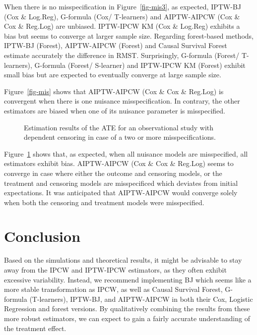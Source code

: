 \documentclass[
  11pt,
  a4paper,
]{article}
\theoremstyle{plain}
\theoremstyle{plain}
\theoremstyle{plain}
\theoremstyle{definition}
\theoremstyle{remark}
\begin{document}
When there is no misspecification in Figure~\ref{fig-mis3}, as expected,
IPTW-BJ (Cox \& Log.Reg), G-formula (Cox/ T-learners) and AIPTW-AIPCW
(Cox \& Cox \& Reg.Log) are unbiased. IPTW-IPCW KM (Cox \& Log.Reg)
exhibits a bias but seems to converge at larger sample size. Regarding
forest-based methods, IPTW-BJ (Forest), AIPTW-AIPCW (Forest) and Causal
Survival Forest estimate accurately the difference in RMST.
Surprisingly, G-formula (Forest/ T-learners), G-formula (Forest/
S-learner) and IPTW-IPCW KM (Forest) exhibit small bias but are expected
to eventually converge at large sample size.

Figure~\ref{fig-mis} shows that AIPTW-AIPCW (Cox \& Cox \& Reg.Log) is
convergent when there is one nuisance misspecification. In contrary, the
other estimators are biased when one of its nuisance parameter is
misspecified.

\begin{figure}


\caption{\label{fig-mis2}Estimation results of the ATE for an
observational study with dependent censoring in case of a two or more
misspecifications.}

\end{figure}%

Figure~\ref{fig-mis2} shows that, as expected, when all nuisance models
are misspecified, all estimators exhibit bias. AIPTW-AIPCW (Cox \& Cox
\& Reg.Log) seems to converge in case where either the outcome and
censoring models, or the treatment and censoring models are
misspecificed which deviates from initial expectations. It was
anticipated that AIPTW-AIPCW would converge solely when both the
censoring and treatment models were misspecified.

\section{Conclusion}\label{sec-conclusion}

Based on the simulations and theoretical results, it might be advisable
to stay away from the IPCW and IPTW-IPCW estimators, as they often
exhibit excessive variability. Instead, we recommend implementing BJ
which seems like a more stable transformation as IPCW, as well as Causal
Survival Forest, G-formula (T-learners), IPTW-BJ, and AIPTW-AIPCW in
both their Cox, Logistic Regression and forest versions. By
qualitatively combining the results from these more robust estimators,
we can expect to gain a fairly accurate understanding of the treatment
effect.
\end{document}
